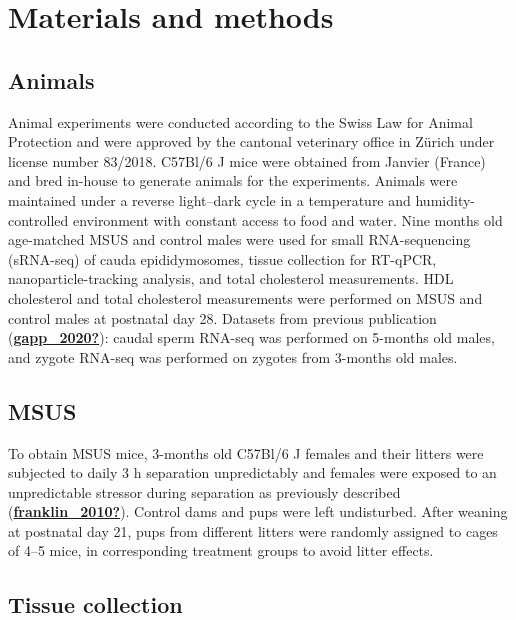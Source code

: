 \documentclass[12pt,twoside]{reedthesis}
\begin{document}
\hypertarget{materials-and-methods}{%
\section{Materials and methods}\label{materials-and-methods}}

\hypertarget{animals}{%
\subsection{Animals}\label{animals}}

Animal experiments were conducted according to the Swiss Law for Animal
Protection and were approved by the cantonal veterinary office in Zürich
under license number 83/2018. C57Bl/6 J mice were obtained from Janvier
(France) and bred in-house to generate animals for the experiments.
Animals were maintained under a reverse light--dark cycle in a
temperature and humidity-controlled environment with constant access to
food and water. Nine months old age-matched MSUS and control males were
used for small RNA-sequencing (sRNA-seq) of cauda epididymosomes, tissue
collection for RT-qPCR, nanoparticle-tracking analysis, and total
cholesterol measurements. HDL cholesterol and total cholesterol
measurements were performed on MSUS and control males at postnatal day
28. Datasets from previous publication (\protect\hyperlink{ref-gapp_2020}{\textbf{gapp\_2020?}}): caudal sperm
RNA-seq was performed on 5-months old males, and zygote RNA-seq was
performed on zygotes from 3-months old males.

\hypertarget{msus}{%
\subsection{MSUS}\label{msus}}

To obtain MSUS mice, 3-months old C57Bl/6 J females and their litters
were subjected to daily 3 h separation unpredictably and females were
exposed to an unpredictable stressor during separation as previously
described (\protect\hyperlink{ref-franklin_2010}{\textbf{franklin\_2010?}}). Control dams and pups were left undisturbed.
After weaning at postnatal day 21, pups from different litters were
randomly assigned to cages of 4--5 mice, in corresponding treatment
groups to avoid litter effects.

\hypertarget{tissue-collection}{%
\subsection{Tissue collection}\label{tissue-collection}}
\end{document}
